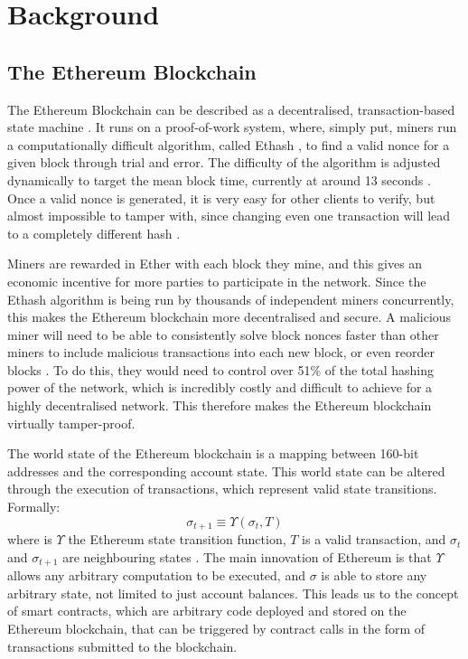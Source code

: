 \chapter{Background}

\section{The Ethereum Blockchain}

The Ethereum Blockchain can be described as a decentralised, transaction-based 
state machine \cite{ethereumyellowpaper}. It runs on a proof-of-work system,
where, simply put, miners run a computationally difficult algorithm, called Ethash
\cite{ethash}, to find a valid nonce for a given block through trial and error. 
The difficulty of the algorithm is adjusted dynamically to target the mean block time, 
currently at around 13 seconds \cite{eip100}. Once a valid nonce is generated,
it is very easy for other clients to verify, but almost impossible to tamper with,
since changing even one transaction will lead to a completely different hash \cite{ethereumpow}.

Miners are rewarded in Ether with each block they mine, and this gives an economic incentive for more 
parties to participate in the network. Since the Ethash algorithm is being run by thousands of independent miners concurrently,
this makes the Ethereum blockchain more decentralised and secure. A malicious miner
will need to be able to consistently solve block nonces faster than other miners to 
include malicious transactions into each new block, or even reorder blocks \cite{eth51percentattack}. 
To do this, they would need to control over 51\% of the total hashing power 
of the network, which is incredibly costly and difficult to achieve for a highly decentralised
network. This therefore makes the Ethereum blockchain virtually tamper-proof.

The world state of the Ethereum blockchain is a mapping between 160-bit addresses 
and the corresponding account state. This world state can be altered through the 
execution of transactions, which represent valid state transitions. Formally:
\[ \sigma_{t + 1} \equiv \Upsilon(\sigma_{t}, T) \]
where is $\Upsilon$ the Ethereum state transition function, $T$ is a valid transaction,
and $\sigma_{t}$ and $\sigma_{t + 1}$ are neighbouring states \cite{ethereumyellowpaper}.
The main innovation of Ethereum is that $\Upsilon$ allows any arbitrary computation to
be executed, and $\sigma$ is able to store any arbitrary state, not limited to just account 
balances. This leads us to the concept of smart contracts, which are arbitrary code deployed
and stored on the Ethereum blockchain, that can be triggered by contract calls in the form
of transactions submitted to the blockchain.

